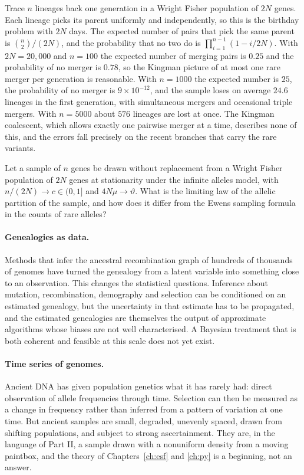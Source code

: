 \begin{example}\label{future:ex:birthday}
Trace $n$ lineages back one generation in a Wright Fisher population of $2N$ genes. Each lineage
picks its parent uniformly and independently, so this is the birthday problem with $2N$ days. The
expected number of pairs that pick the same parent is $\binom n2/(2N)$, and the probability that
no two do is $\prod_{i=1}^{n-1}(1-i/2N)$. With $2N=20{,}000$ and $n=100$ the expected number of
merging pairs is $0.25$ and the probability of no merger is $0.78$, so the Kingman picture of at
most one rare merger per generation is reasonable. With $n=1000$ the expected number is $25$, the
probability of no merger is $9\times10^{-12}$, and the sample loses on average $24.6$ lineages in
the first generation, with simultaneous mergers and occasional triple mergers. With $n=5000$ about
$576$ lineages are lost at once. The Kingman coalescent, which allows exactly one pairwise merger
at a time, describes none of this, and the errors fall precisely on the recent branches that carry
the rare variants.
\end{example}

\begin{question}\label{future:q:finite}
Let a sample of $n$ genes be drawn without replacement from a Wright Fisher population of $2N$
genes at stationarity under the infinite alleles model, with $n/(2N)\to c\in(0,1]$ and
$4N\mu\to\vartheta$. What is the limiting law of the allelic partition of the sample, and how does
it differ from the Ewens sampling formula in the counts of rare alleles?
\end{question}

\paragraph{Genealogies as data.} Methods that infer the ancestral recombination graph of hundreds of
thousands of genomes have turned the genealogy from a latent variable into something close to an
observation. This changes the statistical questions. Inference about mutation, recombination,
demography and selection can be conditioned on an estimated genealogy, but the uncertainty in that
estimate has to be propagated, and the estimated genealogies are themselves the output of
approximate algorithms whose biases are not well characterised. A Bayesian treatment that is both
coherent and feasible at this scale does not yet exist.

\paragraph{Time series of genomes.} Ancient DNA has given population genetics what it has rarely had:
direct observation of allele frequencies through time. Selection can then be measured as a change in
frequency rather than inferred from a pattern of variation at one time. But ancient samples are
small, degraded, unevenly spaced, drawn from shifting populations, and subject to strong
ascertainment. They are, in the language of Part II, a sample drawn with a nonuniform density from
a moving paintbox, and the theory of Chapters~\ref{ch:esf} and \ref{ch:py} is a beginning, not an
answer.

